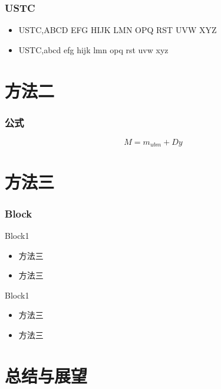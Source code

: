 ﻿\documentclass[12pt]{ctexbeamer}	%
\begin{document}
\begin{frame}
\frametitle{USTC}

\begin{itemize}
\item<1-> USTC,ABCD EFG HIJK LMN OPQ RST UVW XYZ
\item<2-> USTC,abcd efg hijk lmn opq rst uvw xyz
\end{itemize}


\end{frame}


\section{方法二}

\begin{frame}
\frametitle{公式}
$$M=m_{ubm}+Dy$$
\end{frame}


\section{方法三}

\begin{frame}
\frametitle{Block}
\begin{block}{Block1}
	\begin{itemize}
		\item 方法三
        \item 方法三
	\end{itemize}
\end{block}
\pause
\begin{block}{Block1}
	\begin{itemize}
		\item 方法三
        \item 方法三
	\end{itemize}
\end{block}
\end{frame}


\section{总结与展望}
\end{document}
